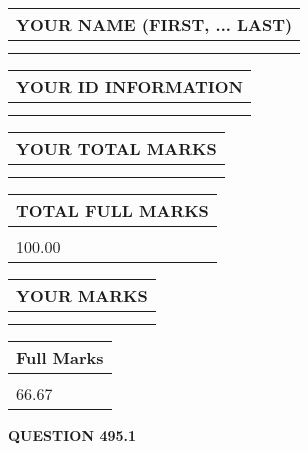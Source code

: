 \documentclass{ctexart}
\begin{document}
   
   
   
\newpage 
\setcounter{page}{ 
   495001 } 
   
   
   
   
\noindent\begin{tabular}{|l|}
\hline
YOUR NAME (FIRST, ... LAST)  \\
\hline
 \\ 
 \\ 
\hline
\end{tabular}
\hspace{0.05in} \begin{tabular}{|l|}
\hline
 YOUR   ID   INFORMATION  \\
\hline
 \\ 
 \\ 
\hline
\end{tabular}
   
   
\vspace{0.2in}\noindent\begin{tabular}{|l|}
\hline
YOUR TOTAL MARKS  \\
\hline
 \\ 
 \\ 
\hline
\end{tabular}
\hspace{0.05in} \begin{tabular}{|l|}
\hline
TOTAL FULL MARKS  \\
\hline
 \\ 
100.00 \\
\hline
\end{tabular}
   
   
 \vspace{0.2in}
 
 
 
 
   
   
  
\vspace{0.2in}
  
\noindent\begin{tabular}{|l|}
\hline
 YOUR MARKS  \\
\hline
 \\ 
 \\ 
\hline
\end{tabular}
\hspace{0.05in} \begin{tabular}{|l|}
\hline
 Full Marks  \\
\hline
 \\ 
66.67 \\
\hline
\end{tabular}
{\textbf{\Large{QUESTION
495.1 
}}}
  
\end{document}
